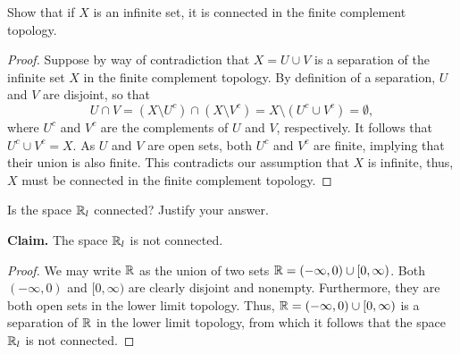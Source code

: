 \begin{exercise}[ID=3.23.4]
  Show that if $X$ is an infinite set, it is connected in the finite complement topology.
\end{exercise}
%
\begin{solution}
  \begin{proof}
    Suppose by way of contradiction that $X = U \cup V$ is a separation of the infinite set $X$ in the finite complement topology.
    By definition of a separation, $U$ and $V$ are disjoint, so that
    \begin{equation*}
      U \cap V = (X \setminus U^c) \cap (X \setminus V^c) = X \setminus (U^c \cup V^c) = \emptyset,
    \end{equation*}
    where $U^c$ and $V^c$ are the complements of $U$ and $V$, respectively.
    It follows that $U^c \cup V^c = X$.
    As $U$ and $V$ are open sets, both $U^c$ and $V^c$ are finite, implying that their union is also finite.
    This contradicts our assumption that $X$ is infinite, thus, $X$ must be connected in the finite complement topology.
  \end{proof}
\end{solution}
\newpage

\begin{exercise}[ID=3.23.7]
  Is the space $\mathbb{R}_l$ connected?
  Justify your answer.
\end{exercise}
%
\begin{solution}
  \textbf{Claim.} The space $\mathbb{R}_l$ is not connected.
  \begin{proof}
    We may write $\mathbb{R}$ as the union of two sets $\mathbb{R} = (-\infty, 0) \cup [0, \infty)$.
    Both $(-\infty, 0)$ and $[0, \infty)$ are clearly disjoint and nonempty.
    Furthermore, they are both open sets in the lower limit topology.
    Thus, $\mathbb{R} = (-\infty, 0) \cup [0, \infty)$ is a separation of $\mathbb{R}$ in the lower limit topology, from which it follows that the space $\mathbb{R}_l$ is not connected.
  \end{proof}
\end{solution}
\newpage

